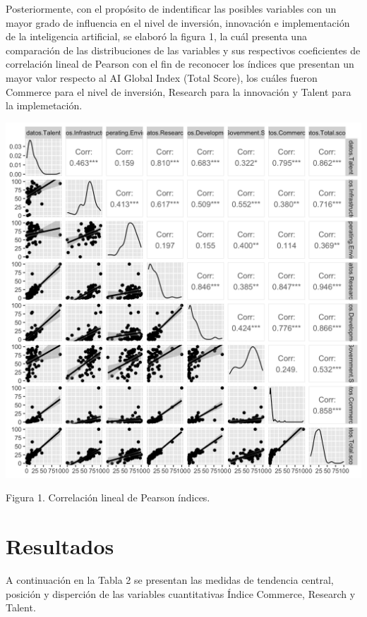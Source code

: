 \documentclass[
]{article}
\begin{document}
\begin{multicols}{2}


Posteriormente, con el propósito de indentificar las posibles variables con un mayor grado de influencia en el nivel de inversión, innovación e implementación de la inteligencia artificial, se elaboró la figura 1, la cuál presenta una comparación de las distribuciones de las variables y sus respectivos coeficientes de correlación lineal de Pearson con el fin de reconocer los índices que presentan un mayor valor respecto al AI Global Index (Total Score), los cuáles fueron Commerce para el nivel de inversión, Research para la innovación y Talent para la implemetación. 





\begin{center}
\includegraphics[width=\linewidth]{figura1.png}
\end{center}
Figura 1. Correlación lineal de Pearson índices.

\section{Resultados}
A continuación en la Tabla 2 se presentan las medidas de tendencia central, posición y disperción de las variables cuantitativas Índice Commerce, Research y Talent.



\end{multicols}
\end{document}
